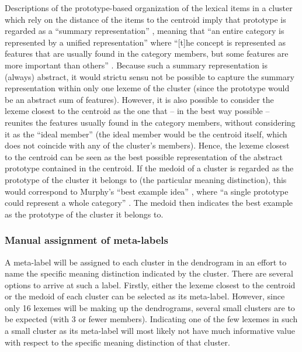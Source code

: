 Descriptions of the prototype-based organization of the lexical items in a cluster which rely on the distance of the items to the centroid imply that prototype is regarded as a “summary representation” \citep[42]{murphy_big_2004}, meaning that “an entire category is represented by a unified representation” where “[t]he concept is represented as features that are usually found in the category members, but some features are more important than others” \citep[42]{murphy_big_2004}. Because such a summary representation is (always) abstract, it would strictu sensu not be possible to capture the summary representation within only one lexeme of the cluster (since the prototype would be an abstract sum of features). However, it is also possible to consider the lexeme closest to the centroid as the one that – in the best way possible – reunites the features usually found in the category members, without considering it as the ``ideal member'' (the ideal member would be the centroid itself, which does not coincide with any of the cluster’s members). Hence, the lexeme closest to the centroid can be seen as the best possible representation of the abstract prototype contained in the centroid. If the medoid of a cluster is regarded as the prototype of the cluster it belongs to (the particular meaning distinction), this would correspond to Murphy’s “best example idea” \citep[42]{murphy_big_2004}, where “a single prototype could represent a whole category” \citep[42]{murphy_big_2004}. The medoid then indicates the best example as the prototype of the cluster it belongs to.

\subsubsection{Manual assignment of meta-labels}
\label{sec:3.8.1.4}  

A meta-label will be assigned to each cluster in the dendrogram in an effort to name the specific meaning distinction indicated by the cluster. There are several options to arrive at such a label. Firstly, either the lexeme closest to the centroid or the medoid of each cluster can be selected as its meta-label. However, since only 16 lexemes will be making up the dendrograms, several small clusters are to be expected (with 3 or fewer members). Indicating one of the few lexemes in such a small cluster as its meta-label will most likely not have much informative value with respect to the specific meaning distinction of that cluster.

